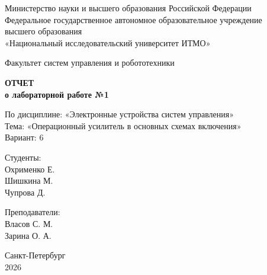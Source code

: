 \documentclass[a4paper,12pt]{article}
\begin{document}
	
	\begin{titlepage}
		\centering
		\vspace*{1cm}
		
		{\small
			Министерство науки и высшего образования Российской Федерации\\
			Федеральное государственное автономное образовательное учреждение\\
			высшего образования\\
			«Национальный исследовательский университет ИТМО»\\
		}
		
		\vspace{2cm}
		
		{\large
			Факультет систем управления и робототехники\\
		}
		
		\vspace{3cm}
		
		{\Huge\bfseries
			ОТЧЕТ\\
		}
		\vspace{0.5cm}
		{\LARGE\bfseries
			о лабораторной работе №1\\
		}
		
		\vspace{1cm}
		
		{\Large
			По дисциплине: «Электронные устройства систем управления»\\
			\vspace{0.5cm}
			Тема: «Операционный усилитель в основных схемах включения»\\
			\vspace{0.5cm}
			Вариант: 6
		}
		
		\vspace{3cm}
		
		\begin{minipage}{0.4\textwidth}
			\raggedright
			{\large
				Студенты:\\
			}
			Охрименко Е. \\
			Шишкина М. \\
			Чупрова Д. \\
		\end{minipage}
		\hfill
		\begin{minipage}{0.4\textwidth}
			\raggedleft
			{\large
				Преподаватели:\\
			}
			Власов С. М. \\
			Зарина О. А.
		\end{minipage}
		
		\vfill
		
		{\large
			Санкт-Петербург\\
			2026\\
		}
		
	\end{titlepage}
	
\end{document}
